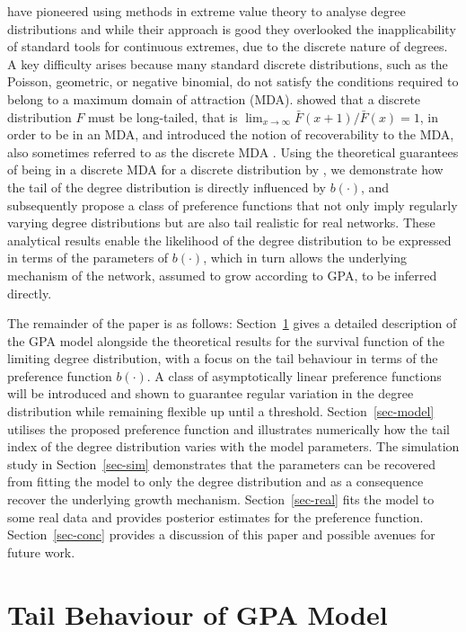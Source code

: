 \documentclass[
  sn-basic,
  10pt,
]{sn-jnl}
\theoremstyle{plain}
\theoremstyle{plain}
\theoremstyle{remark}
\begin{document}
\citet{Voitalov_2019} have pioneered using methods in extreme value
theory to analyse degree distributions and while their approach is good
they overlooked the inapplicability of standard tools for continuous
extremes, due to the discrete nature of degrees. A key difficulty arises
because many standard discrete distributions, such as the Poisson,
geometric, or negative binomial, do not satisfy the conditions required
to belong to a maximum domain of attraction (MDA). \citet{shimura12}
showed that a discrete distribution \(F\) must be long-tailed, that is
\(\lim_{x\rightarrow\infty}\bar F(x+1)/\bar F(x) = 1\), in order to be
in an MDA, and introduced the notion of recoverability to the MDA, also
sometimes referred to as the discrete MDA \citep{hitz24}. Using the
theoretical guarantees of being in a discrete MDA for a discrete
distribution by \citet{shimura12}, we demonstrate how the tail of the
degree distribution is directly influenced by \(b(\cdot)\), and
subsequently propose a class of preference functions that not only imply
regularly varying degree distributions but are also tail realistic for
real networks. These analytical results enable the likelihood of the
degree distribution to be expressed in terms of the parameters of
\(b(\cdot)\), which in turn allows the underlying mechanism of the
network, assumed to grow according to GPA, to be inferred directly.

The remainder of the paper is as follows: Section~\ref{sec-tail} gives a
detailed description of the GPA model alongside the theoretical results
for the survival function of the limiting degree distribution, with a
focus on the tail behaviour in terms of the preference function
\(b(\cdot)\). A class of asymptotically linear preference functions will
be introduced and shown to guarantee regular variation in the degree
distribution while remaining flexible up until a threshold.
Section~\ref{sec-model} utilises the proposed preference function and
illustrates numerically how the tail index of the degree distribution
varies with the model parameters. The simulation study in
Section~\ref{sec-sim} demonstrates that the parameters can be recovered
from fitting the model to only the degree distribution and as a
consequence recover the underlying growth mechanism.
Section~\ref{sec-real} fits the model to some real data and provides
posterior estimates for the preference function. Section~\ref{sec-conc}
provides a discussion of this paper and possible avenues for future
work.

\section{Tail Behaviour of GPA Model}\label{sec-tail}
\end{document}
